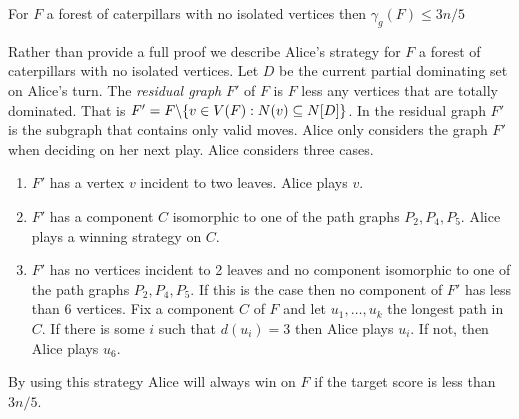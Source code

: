\begin{theorem}\label{thm:domcat}
    For $F$ a forest of caterpillars with no isolated vertices then 
    $\gamma_g(F)\leq 3n/5$ 
\end{theorem}
Rather than provide a full proof we describe Alice's strategy for $F$ a forest of caterpillars with no isolated vertices. 
    Let $D$ be the current partial dominating set on Alice's turn. The \textit{residual graph} $F'$ of $F$ is $F$ less any vertices that are totally dominated. That is $F'=F\backslash\{v\in V(F): N(v)\subseteq N[D]\}$. In the residual graph $F'$ is the subgraph that contains only valid moves. Alice only considers the graph $F'$ when deciding on her next play. Alice considers three cases.
    \begin{enumerate}        
    \item $F'$ has a vertex $v$ incident to two leaves. Alice plays $v$. 
    
    \item $F'$ has a component $C$ isomorphic to one of the path graphs $P_2,P_4,P_5$. Alice plays a winning strategy on $C$. 
    
    \item $F'$ has no vertices incident to 2 leaves and no component isomorphic to one of the path graphs $P_2,P_4,P_5$. If this is the case then no component of $F'$ has less than 6 vertices. Fix a component $C$ of $F$ and let $u_1,\dots,u_k$ the longest path in $C$. If there is some $i$ such that $d(u_i)=3$ then Alice plays $u_i$. If not, then Alice plays $u_6$.    
    \end{enumerate}
By using this strategy Alice will always win on $F$ if the target score is less than $3n/5$.
    
